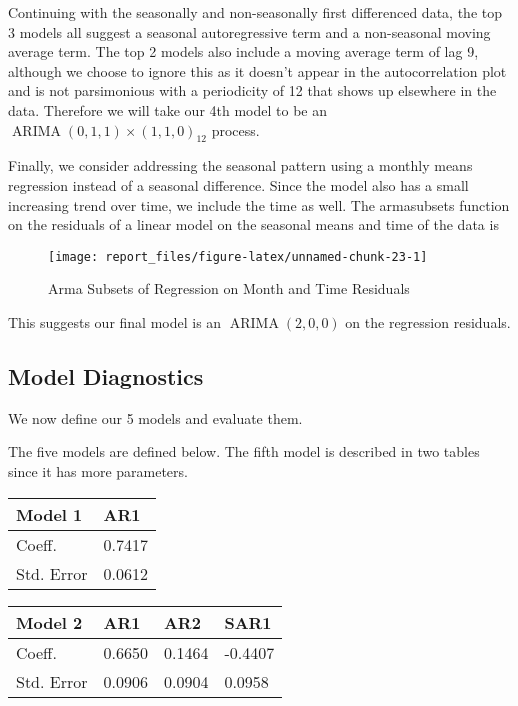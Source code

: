 \documentclass[
]{article}
\begin{document}
Continuing with the seasonally and non-seasonally first differenced
data, the top 3 models all suggest a seasonal autoregressive term and a
non-seasonal moving average term. The top 2 models also include a moving
average term of lag 9, although we choose to ignore this as it doesn't
appear in the autocorrelation plot and is not parsimonious with a
periodicity of 12 that shows up elsewhere in the data. Therefore we will
take our 4th model to be an
\(\mathop{\mathrm{ARIMA}}(0,1,1) \times (1,1,0)_{12}\) process.

Finally, we consider addressing the seasonal pattern using a monthly
means regression instead of a seasonal difference. Since the model also
has a small increasing trend over time, we include the time as well. The
armasubsets function on the residuals of a linear model on the seasonal
means and time of the data is

\begin{figure}[H]

{\centering \texttt{[image: report\_files/figure-latex/unnamed-chunk-23-1]} 

}

\caption{Arma Subsets of Regression on Month and Time Residuals}\label{fig:unnamed-chunk-23}
\end{figure}

This suggests our final model is an \(\mathop{\mathrm{ARIMA}}(2,0,0)\)
on the regression residuals.

\subsection{Model Diagnostics}

We now define our 5 models and evaluate them.

The five models are defined below. The fifth model is described in two
tables since it has more parameters.

\begin{longtable}[]{@{}ll@{}}
\toprule
Model 1 & AR1\tabularnewline
\midrule
\endhead
Coeff. & 0.7417\tabularnewline
Std. Error & 0.0612\tabularnewline
\bottomrule
\end{longtable}

\begin{longtable}[]{@{}llll@{}}
\toprule
Model 2 & AR1 & AR2 & SAR1\tabularnewline
\midrule
\endhead
Coeff. & 0.6650 & 0.1464 & -0.4407\tabularnewline
Std. Error & 0.0906 & 0.0904 & 0.0958\tabularnewline
\bottomrule
\end{longtable}
\end{document}

